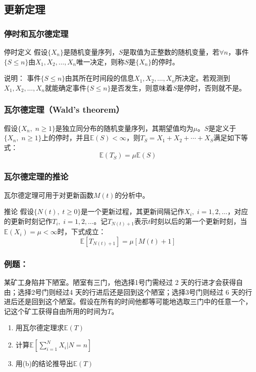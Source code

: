 \documentclass[t]{beamer}
\newcommand{\E}{\mathbb{E}}
\begin{document}
\subsection{更新定理}
\begin{frame}
  \frametitle{停时和瓦尔德定理}
\begin{block}{停时定义}
  假设$\{X_n\}$是随机变量序列，$S$是取值为正整数的随机变量，若$\forall n$，事件$\{S\le n\}$由$X_1,X_2,\ldots, X_n$唯一决定，则称$S$是$\{X_n\}$的停时。
\end{block}
  
\begin{block}{说明：}
  事件$\{S\le n\}$由其所在时间段的信息$X_1,X_2,\ldots, X_n$所决定。若观测到$X_1,X_2,\ldots, X_n$就能确定事件$\{S\le n\}$是否发生，则意味着$S$是停时，否则就不是。
\end{block}
\end{frame}


\begin{frame}
  \frametitle{瓦尔德定理（Wald's theorem）}
  假设$\{X_n,\; n\ge 1\}$是独立同分布的随机变量序列，其期望值均为$\mu$。$S$是定义于$\{X_n,\; n\ge 1\}$上的停时，并且$\E(S)<\infty$，则$T_S=X_1+X_2+\cdots+X_S$满足如下等式：
  \begin{equation*}
      \E(T_S)=\mu \E(S)
  \end{equation*}
\end{frame}


\begin{frame}
  \frametitle{瓦尔德定理的推论}
  瓦尔德定理可用于对更新函数$M(t)$的分析中。

  \begin{block}{推论}
    假设$\{N(t),\; t\ge 0\}$是一个更新过程，其更新间隔记作$X_i,\; i=1,2,\ldots$，对应的更新时刻记作$T_i,\; i=1,2,\ldots$。记$T_{N(t)+1}$表示$t$时刻以后的第一个更新时刻，当$\E(X_i)=\mu<\infty$时，下式成立：
\begin{equation*}
    \E[T_{N(t)+1}]=\mu [M(t)+1]
\end{equation*}
  \end{block}

\end{frame}


\begin{frame}
  \frametitle{例题：}
  某矿工身陷井下陋室。陋室有三门，他选择1号门需经过 2 天的行进才会获得自由；选择2号门则经过4 天的行进后还是回到这个陋室；选择3号门则经过 6 天的行进后还是回到这个陋室。假设在所有的时间他都等可能地选取三门中的任意一个，记这个矿工获得自由所用的时间为$T$。
\begin{enumerate}
    \item 用瓦尔德定理求$\E(T)$
    \item 计算$\E\left[\displaystyle\sum\limits^N_{i=1}X_i\Big|N=n\right]$
    \item 用(b)的结论推导出$\E(T)$
\end{enumerate}    
\end{frame}
\end{document}
